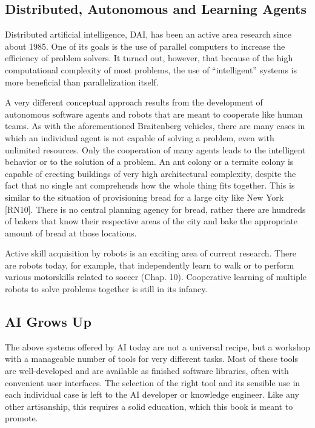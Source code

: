 \documentclass[10pt]{book}
\begin{document}
\subsection{Distributed, Autonomous and Learning Agents}
Distributed artificial intelligence, DAI, has been an active area research since about 1985. One of its goals is the use of parallel computers to increase the efficiency of problem solvers. It turned out, however, that because of the high computational complexity of most problems, the use of ``intelligent'' systems is more beneficial than parallelization itself.

A very different conceptual approach results from the development of autonomous software agents and robots that are meant to cooperate like human teams. As with the aforementioned Braitenberg vehicles, there are many cases in which an individual agent is not capable of solving a problem, even with unlimited resources. Only the cooperation of many agents leads to the intelligent behavior or to the solution of a problem. An ant colony or a termite colony is capable of erecting buildings of very high architectural complexity, despite the fact that no single ant comprehends how the whole thing fits together. This is similar to the situation of provisioning bread for a large city like New York [RN10]. There is no central planning agency for bread, rather there are hundreds of bakers that know their respective areas of the city and bake the appropriate amount of bread at those locations.

Active skill acquisition by robots is an exciting area of current research. There are robots today, for example, that independently learn to walk or to perform various motorskills related to soccer (Chap. 10). Cooperative learning of multiple robots to solve problems together is still in its infancy.
\subsection{AI Grows Up}
The above systems offered by AI today are not a universal recipe, but a workshop with a manageable number of tools for very different tasks. Most of these tools are well-developed and are available as finished software libraries, often with convenient user interfaces. The selection of the right tool and its sensible use in each individual case is left to the AI developer or knowledge engineer. Like any other artisanship, this requires a solid education, which this book is meant to promote.
\end{document}
